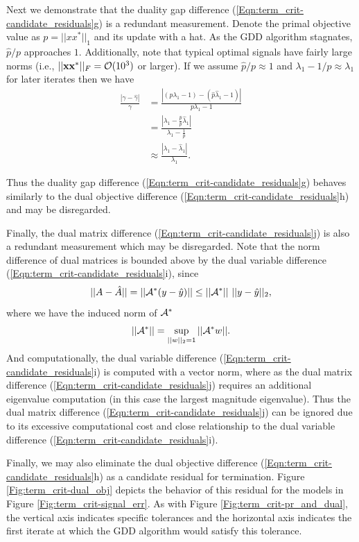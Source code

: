 Next we demonstrate that the duality gap difference (\ref{Eqn:term_crit-candidate_residuals}g) is a redundant measurement.  Denote the primal objective value as $p = ||xx^*||_1$ and its update with a hat.  As the GDD algorithm stagnates, $\hat{p} / p$ approaches $1$. Additionally, note that typical optimal signals have fairly large norms (i.e., $||\mathbf{x}\mathbf{x}^*||_F = {\mathcal O}(10^3)$ or larger).  If we assume $\hat{p}/p \approx 1$ and $\lambda_1 -  1/p \approx \lambda_1$ for later iterates then we have
\begin{equation}
\begin{split}
\frac{| \gamma - \hat{\gamma}|}{\gamma}	&	=	\frac{| (p \lambda_1 - 1) - (\hat{p}\hat{\lambda}_1 - 1) |}{p \lambda_1 - 1}
		\\
	&	= \frac{\left| \lambda_1 - \frac{\hat{p}}{p}\hat{\lambda}_1 \right|}{ \lambda_1 - \frac{1}{p} }
		\\
	&	\approx \frac{| \lambda_1 - \hat{\lambda}_1|}{\lambda_1}.
\end{split}
\end{equation}

Thus the duality gap difference (\ref{Eqn:term_crit-candidate_residuals}g) behaves similarly to the dual objective difference (\ref{Eqn:term_crit-candidate_residuals}h) and may be disregarded.  

Finally, the dual matrix difference (\ref{Eqn:term_crit-candidate_residuals}j) is also a redundant measurement which may be disregarded.  Note that the norm difference of dual matrices is bounded above by the dual variable difference (\ref{Eqn:term_crit-candidate_residuals}i), since
\[
||A - \hat{A}|| = ||{\mathcal A}^*(y - \hat{y})|| \leq ||{\mathcal A}^*|| \ ||y - \hat{y}||_2,
\]
where we have the induced norm of ${\mathcal A}^*$
\[
||{\mathcal A}^*|| = \sup_{\substack{||w||_2=1}}||{\mathcal A}^*w||.
\]
And computationally, the dual variable difference (\ref{Eqn:term_crit-candidate_residuals}i) is computed with a vector norm, where as the dual matrix difference (\ref{Eqn:term_crit-candidate_residuals}j) requires an additional eigenvalue computation (in this case the largest magnitude eigenvalue).  Thus the dual matrix difference (\ref{Eqn:term_crit-candidate_residuals}j) can be ignored due to its excessive computational cost and close relationship to the dual variable difference (\ref{Eqn:term_crit-candidate_residuals}i).



Finally, we may also eliminate the dual objective difference (\ref{Eqn:term_crit-candidate_residuals}h) as a candidate residual for termination.  Figure \ref{Fig:term_crit-dual_obj} depicts the behavior of this residual for the models in Figure \ref{Fig:term_crit-signal_err}.  As with Figure \ref{Fig:term_crit-pr_and_dual}, the vertical axis indicates specific tolerances and the horizontal axis indicates the first iterate at which the GDD algorithm would satisfy this tolerance.



